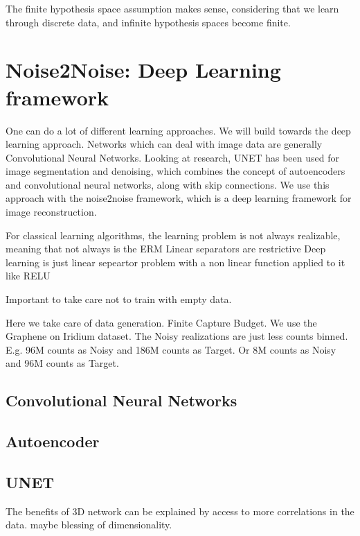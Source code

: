 The finite hypothesis space assumption makes sense, considering that we learn through discrete data, and infinite hypothesis spaces become finite. 


\section{Noise2Noise: Deep Learning framework}
One can do a lot of different learning approaches. We will build towards the deep learning approach. Networks which can deal with image data are generally Convolutional Neural Networks. Looking at research, UNET has been used for image segmentation and denoising, which combines the concept of autoencoders and convolutional neural networks, along with skip connections.
We use this approach with the noise2noise framework, which is a deep learning framework for image reconstruction.

For classical learning algorithms, the learning problem is not always realizable, meaning that not always is the 
ERM 
Linear separators are restrictive
Deep learning is just linear sepeartor problem with a non linear function applied to it like RELU



Important to take care not to train with empty data. \cite{lehtinenNoise2NoiseLearningImage2018}

Here we take care of data generation. Finite Capture Budget. We use the Graphene on Iridium dataset. The Noisy realizations are just less counts binned. 
E.g. 96M counts as Noisy and 186M counts as Target. Or 8M counts as Noisy and 96M counts as Target.
\subsection{Convolutional Neural Networks}
\subsection{Autoencoder}
\cite{goodfellowDeepLearning2016}
\subsection{UNET}


The benefits of 3D network can be explained by access to more correlations in the data. maybe blessing of dimensionality.